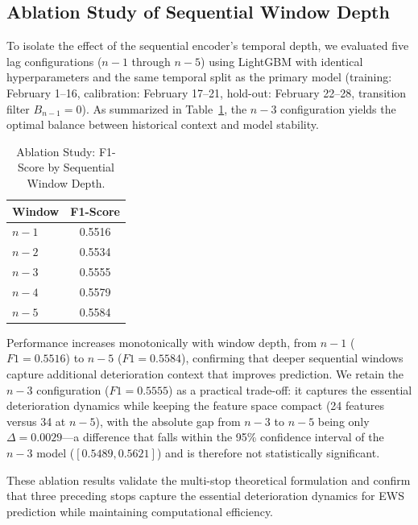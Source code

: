 \documentclass[fleqn,10pt,lineno]{wlpeerj}
\begin{document}
\subsection{Ablation Study of Sequential Window Depth}
\label{sec:ablation}

To isolate the effect of the sequential encoder's temporal depth, we evaluated five lag
configurations ($n{-}1$ through $n{-}5$) using LightGBM with identical hyperparameters and the same temporal split as the primary model (training: February 1--16, calibration: February 17--21, hold-out: February 22--28, transition filter $B_{n-1}=0$). As summarized in Table~\ref{tab:ablation}, the $n{-}3$ configuration yields the optimal balance between historical context and model stability.

\begin{table}[htbp]
  \caption{Ablation Study: F1-Score by Sequential Window Depth.}
  \centering
  \begin{tabular}{@{}lc@{}}
    \toprule
    \textbf{Window} & \textbf{F1-Score} \\ \midrule
    $n-1$           & 0.5516             \\
    $n-2$           & 0.5534             \\
    $n-3$           & 0.5555             \\
    $n-4$           & 0.5579             \\
    $n-5$           & 0.5584             \\ \bottomrule
  \end{tabular}
  \label{tab:ablation}
\end{table}

Performance increases monotonically with window depth, from $n{-}1$ ($F1=0.5516$) to $n{-}5$ ($F1=0.5584$), confirming that deeper sequential windows capture additional deterioration context that improves prediction. We retain the $n{-}3$ configuration ($F1=0.5555$) as a practical trade-off: it captures the essential deterioration dynamics while keeping the feature space compact (24 features versus 34 at $n{-}5$), with the absolute gap from $n{-}3$ to $n{-}5$ being only $\Delta=0.0029$---a difference that falls within the 95\% confidence interval of the $n{-}3$ model ($[0.5489, 0.5621]$) and is therefore not statistically significant.

These ablation results validate the multi-stop theoretical formulation and confirm that three preceding stops capture the essential deterioration dynamics for EWS prediction while maintaining computational efficiency.
\end{document}
